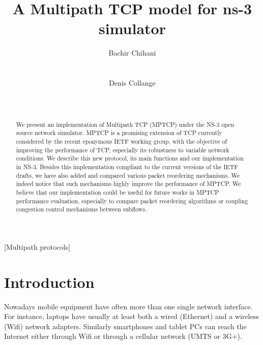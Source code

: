 \documentclass{sig-alternate}
\begin{document}
 \crdata{}  

\title{A Multipath TCP model for ns-3 simulator}


 \author{
\alignauthor
Bachir Chihani\\
       \\
       \\
\alignauthor
Denis Collange\\
       \\
       \\
}


\maketitle
\begin{abstract}

We present an implementation of Multipath TCP (MPTCP) under the NS-3 open source network simulator. MPTCP is a promising extension of TCP currently considered by the recent eponymous IETF working group, with the objective of improving the performance of TCP, especially its robustness to variable network conditions. We describe this new protocol, its main functions and our implementation in NS-3. Besides this implementation compliant to the current versions of the IETF drafts, we have also added and compared various packet reordering mechanisms. We indeed notice that such mechanisms highly improve the performance of MPTCP. We believe that our implementation could be useful for future works in MPTCP performance evaluation, especially to compare packet reordering algorithms or coupling congestion control mechanisms between subflows. 

\end{abstract}

[Multipath protocols]




\section{Introduction}
Nowadays mobile equipment have often more than one single network interface. For instance, laptops have usually at least both a wired (Ethernet) and a wireless (Wifi) network adapters. Similarly smartphones and tablet PCs can reach the Internet either through Wifi or through a cellular network (UMTS or 3G+). 
\end{document}
